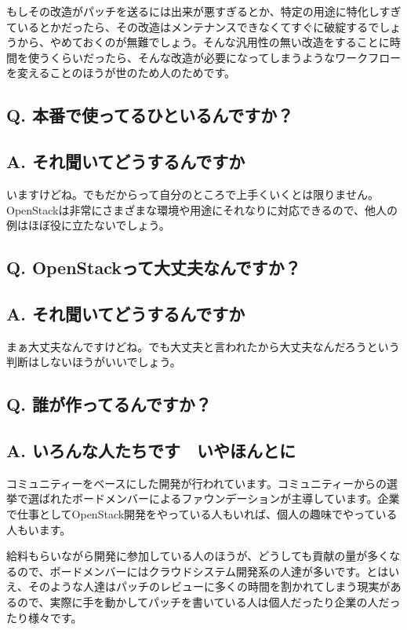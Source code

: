 \documentclass[9pt,b5paper,tombo,openany]{jsbook}
\begin{document}
もしその改造がパッチを送るには出来が悪すぎるとか、特定の用途に特化しすぎているとかだったら、その改造はメンテナンスできなくてすぐに破綻するでしょうから、やめておくのが無難でしょう。そんな汎用性の無い改造をすることに時間を使うくらいだったら、そんな改造が必要になってしまうようなワークフローを変えることのほうが世のため人のためです。

\subsection*{{\LARGE\bfseries Q.} 本番で使ってるひといるんですか？}
\subsection*{{\LARGE\bfseries A.} それ聞いてどうするんですか}
いますけどね。でもだからって自分のところで上手くいくとは限りません。OpenStackは非常にさまざまな環境や用途にそれなりに対応できるので、他人の例はほぼ役に立たないでしょう。

\subsection*{{\LARGE\bfseries Q.} OpenStackって大丈夫なんですか？}
\subsection*{{\LARGE\bfseries A.} それ聞いてどうするんですか}
まぁ大丈夫なんですけどね。でも大丈夫と言われたから大丈夫なんだろうという判断はしないほうがいいでしょう。

\subsection*{{\LARGE\bfseries Q.} 誰が作ってるんですか？}
\subsection*{{\LARGE\bfseries A.} いろんな人たちです　いやほんとに}
コミュニティーをベースにした開発が行われています。コミュニティーからの選挙で選ばれたボードメンバーによるファウンデーションが主導しています。企業で仕事としてOpenStack開発をやっている人もいれば、個人の趣味でやっている人もいます。

給料もらいながら開発に参加している人のほうが、どうしても貢献の量が多くなるので、ボードメンバーにはクラウドシステム開発系の人達が多いです。とはいえ、そのような人達はパッチのレビューに多くの時間を割かれてしまう現実があるので、実際に手を動かしてパッチを書いている人は個人だったり企業の人だったり様々です。
\end{document}
